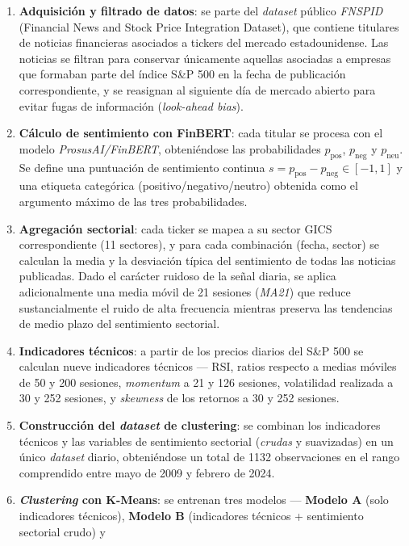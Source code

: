 \begin{enumerate}
  \item \textbf{Adquisición y filtrado de datos}: se parte del
  \textit{dataset} público \textit{FNSPID} (Financial News and Stock
  Price Integration Dataset), que contiene titulares de noticias
  financieras asociados a tickers del mercado estadounidense. Las
  noticias se filtran para conservar únicamente aquellas asociadas a
  empresas que formaban parte del índice S\&P 500 en la fecha de
  publicación correspondiente, y se reasignan al siguiente día de
  mercado abierto para evitar fugas de información (\textit{look-ahead
  bias}).
  \item \textbf{Cálculo de sentimiento con FinBERT}: cada titular se
  procesa con el modelo \textit{ProsusAI/FinBERT}, obteniéndose las
  probabilidades $p_{\text{pos}}$, $p_{\text{neg}}$ y $p_{\text{neu}}$.
  Se define una puntuación de sentimiento continua
  $s = p_{\text{pos}} - p_{\text{neg}} \in [-1,1]$ y una etiqueta
  categórica (positivo/negativo/neutro) obtenida como el argumento
  máximo de las tres probabilidades.
  \item \textbf{Agregación sectorial}: cada ticker se mapea a su sector
  GICS correspondiente (11 sectores), y para cada combinación
  (fecha, sector) se calculan la media y la desviación típica del
  sentimiento de todas las noticias publicadas. Dado el carácter ruidoso
  de la señal diaria, se aplica adicionalmente una media móvil de 21
  sesiones (\textit{MA21}) que reduce sustancialmente el ruido de alta
  frecuencia mientras preserva las tendencias de medio plazo del
  sentimiento sectorial.
  \item \textbf{Indicadores técnicos}: a partir de los precios diarios
  del S\&P 500 se calculan nueve indicadores técnicos --- RSI, ratios
  respecto a medias móviles de 50 y 200 sesiones, \textit{momentum} a 21
  y 126 sesiones, volatilidad realizada a 30 y 252 sesiones, y
  \textit{skewness} de los retornos a 30 y 252 sesiones.
  \item \textbf{Construcción del \textit{dataset} de clustering}: se
  combinan los indicadores técnicos y las variables de sentimiento
  sectorial (\textit{crudas} y suavizadas) en un único \textit{dataset}
  diario, obteniéndose un total de 1132 observaciones en el rango
  comprendido entre mayo de 2009 y febrero de 2024.
  \item \textbf{\textit{Clustering} con K-Means}: se entrenan tres
  modelos --- \textbf{Modelo A} (solo indicadores técnicos), \textbf{Modelo
  B} (indicadores técnicos + sentimiento sectorial crudo) y

\end{enumerate}
